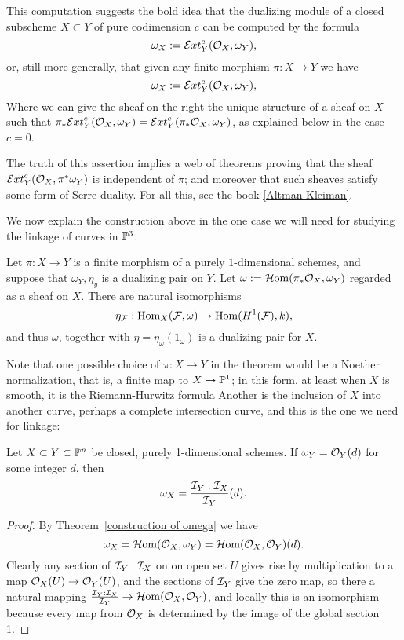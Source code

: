 This computation suggests the bold idea that the dualizing module of a closed subscheme
$X\subset Y$ of pure codimension $c$ can be computed by the formula
$$
\omega_{X} : = \sExt_{Y}^{c}(\cO_{X}, \omega_{Y}),
$$
or, still more generally, that given any finite morphism $\pi: X\to Y$ we have
$$
\omega_{X} : = \sExt_{Y}^{c}(\cO_{X}, \omega_{Y}),
$$
Where we can give the sheaf on the right the unique structure of a sheaf on $X$
such that $\pi_{*}\sExt_{Y}^{c}(\cO_{X}, \omega_{Y}) = \sExt_{Y}^{c}(\pi_{*}\cO_{X}, \omega_{Y})$, as explained below in the case $c=0$.

The truth of this assertion implies a web of theorems proving that the sheaf 
$\sExt_{Y}^{c}(\cO_{X}, \pi^{*}\omega_{Y})$ is independent of $\pi$; and moreover that such sheaves satisfy some form of Serre duality. For all this, see the book
\ref{Altman-Kleiman}.

We now explain the construction above in the one case we will need for studying the linkage of curves in $\PP^{3}$.


\begin{theorem}\label{construction of omega}
Let $\pi: X \to Y$ is a finite morphism of a purely $1$-dimensional schemes, and suppose that
$\omega_{Y}, \eta_{y}$ is a dualizing pair on $Y$. 
Let $\omega := \sHom(\pi_{*}\cO_{X}, \omega_{Y})$ regarded as a sheaf on $X$. There are
natural isomorphisms 
$$
\eta_{\sF}: \Hom_{X}(\sF, \omega) \to \Hom(H^{1}(\sF), k),
$$
and thus $\omega$, together with $\eta = \eta_{\omega}(1_{\omega})$ is a dualizing pair for $X$.
\end{theorem}

Note that one possible choice of $\pi: X\to Y$ in the theorem would be a Noether normalization, that is, a finite map to $X \to \PP^{1}$; in this form, at least when $X$ is smooth, it is the Riemann-Hurwitz formula  Another is the inclusion of $X$ into another curve, perhaps a complete intersection curve, and this is the one we need for linkage:

\begin{corollary}\label{dualizing formula}
 Let $X\subset Y\subset \PP^{n}$ be closed, purely 1-dimensional schemes. If  $\omega_{Y} = \sO_{Y}(d)$ for some integer $d$, then 
 $$
 \omega_{X} = \frac{\sI_{Y}:\sI_{X}}{\sI_{Y}}(d).
 $$
\end{corollary}

\begin{proof}
By Theorem~\ref{construction of omega} we have 
$$
\omega_{X} = \sHom(\sO_{X}, \omega_{Y}) = \sHom(\sO_{X}, \sO_{Y})(d).
$$
Clearly any  section of $\sI_{Y}:\sI_{X}$ on on open set $U$ gives rise by multiplication to a
map   
$\sO_{X}(U) \to \sO_{Y}(U)$, and the sections of  $\sI_{Y}$ give the zero map,
so there a natural mapping $\frac{\sI_{Y}:\sI_{X}}{\sI_{Y}} \to \sHom(\sO_{X}, \sO_{Y})$,
and locally this is an isomorphism because every map from $\sO_{X}$ is determined by the image of the global section 1.
\end{proof}


